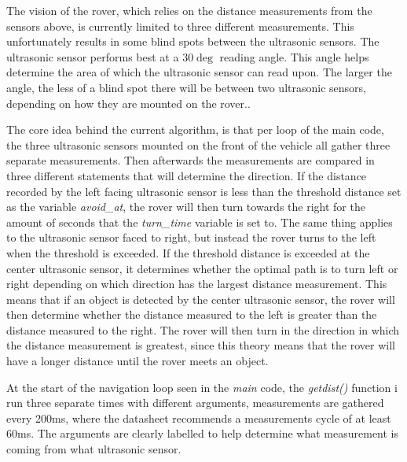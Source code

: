 
The vision of the rover, which relies on the distance measurements from the sensors above, is currently limited to three different measurements. This unfortunately results in some blind spots between the ultrasonic sensors.
The ultrasonic sensor performs best at a $30\deg$ reading angle. This angle helps determine the area of which the ultrasonic sensor can read upon. The larger the angle, the less of a blind spot there will be between two ultrasonic sensors, depending on how they are mounted on the rover.\cite{hcsr40datesheet}.

\clearpage


The core idea behind the current algorithm, is that per loop of the main code, the three ultrasonic sensors mounted on the front of the vehicle all gather three separate measurements. Then afterwards the measurements are compared in three different statements that will determine the direction. If the distance recorded by the left facing ultrasonic sensor is less than the threshold distance set as the variable \textit{avoid\_at}, the rover will then turn towards the right for the amount of seconds that the \textit{turn\_time} variable is set to. The same thing applies to the ultrasonic sensor faced to right, but instead the rover turns to the left when the threshold is exceeded.
If the threshold distance is exceeded at the center ultrasonic sensor, it determines whether the optimal path is to turn left or right depending on which direction has the largest distance measurement. This means that if an object is detected by the center ultrasonic sensor, the rover will then determine whether the distance measured to the left is greater than the distance measured to the right. The rover will then turn in the direction in which the distance measurement is greatest, since this theory means that the rover will have a longer distance until the rover meets an object.



At the start of the navigation loop seen in the \textit{main} code, the \textit{getdist()} function i run three separate times with different arguments, measurements are gathered every 200ms, where the datasheet recommends a measurements cycle of at least 60ms. The arguments are clearly labelled to help determine what measurement is coming from what ultrasonic sensor.
